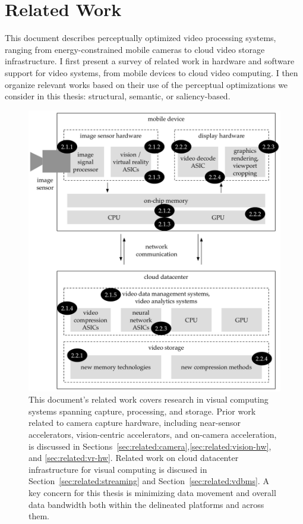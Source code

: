 \chapter{Related Work}\label{ch:related}

This document describes perceptually optimized video processing systems, ranging from energy-constrained mobile cameras to cloud video storage infrastructure. I first present a survey of related work in hardware and software support for video systems, from mobile devices to cloud video computing. I then organize relevant works based on their use of the perceptual optimizations we consider in this thesis: structural, semantic, or saliency-based.

\begin{figure}[h]
\centering
    \begin{center}
\includegraphics[width=\textwidth]{hfbs-figs/related-work.pdf}
    \end{center}
    \caption{This document's related work covers research in visual computing systems spanning capture, processing, and storage. Prior work related to camera capture hardware, including near-sensor accelerators, vision-centric accelerators, and on-camera acceleration, is discussed in Sections~\ref{sec:related:camera},\ref{sec:related:vision-hw}, and \ref{sec:related:vr-hw}. Related work on cloud datacenter infrastructure for visual computing is discused in Section~\ref{sec:related:streaming} and Section~\ref{sec:related:vdbms}. A key concern for this thesis is minimizing data movement and overall data bandwidth both within the delineated platforms and across them.}
    \label{fig:related-work}
\end{figure}


